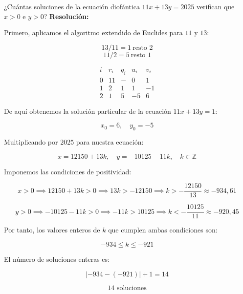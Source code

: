 \documentclass[a4paper,12pt]{article}
\begin{document}
\begin{ejercicio}[title=Ejercicio 10]
¿Cuántas soluciones de la ecuación diofántica $11x + 13y = 2025$ verifican que $x > 0$ e $y > 0$?
\tcblower
\textbf{Resolución:}

Primero, aplicamos el algoritmo extendido de Euclides para $11$ y $13$:

\[
13 / 11 = 1 \ \text{resto } 2
\]
\[
11 / 2 = 5 \ \text{resto } \boxed{1}
\]

\[
\begin{array}{c|c|c|c|c}
i & r_i & q_i & u_i & v_i\\
\hline
0 & 11 & - & 0 & 1\\
1 & 2 & 1 & 1 & -1\\
2 & \boxed{1} & 5 & -5 & 6
\end{array}
\]

De aquí obtenemos la solución particular de la ecuación $11x + 13y = 1$:

\[
x_0 = 6, \quad y_0 = -5
\]

Multiplicando por $2025$ para nuestra ecuación:

\[
x = 12150 + 13k, \quad y = -10125 - 11k, \quad k \in \mathbb{Z}
\]

\vspace{0.5em}

Imponemos las condiciones de positividad:

\[
x > 0 \implies 12150 + 13k > 0 \implies 13k > -12150 \implies k > -\frac{12150}{13} \approx -934,61
\]

\[
y > 0 \implies -10125 - 11k > 0 \implies -11k > 10125 \implies k < -\frac{10125}{11} \approx -920,45
\]

\vspace{0.5em}

Por tanto, los valores enteros de $k$ que cumplen ambas condiciones son:

\[
-934 \le k \le -921
\]

El número de soluciones enteras es:

\[
|-934 - (-921)| + 1 = 14
\]

\[
\boxed{14 \text{ soluciones}}
\]
\end{ejercicio}
\end{document}
